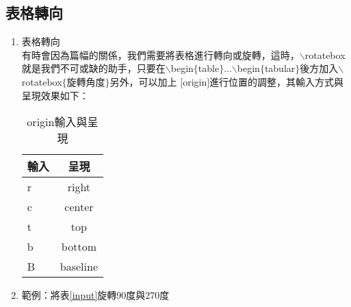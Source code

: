 \subsection{表格轉向}
\begin{enumerate}
\item 表格轉向\\
有時會因為篇幅的關係，我們需要將表格進行轉向或旋轉，這時，$\backslash$rotatebox就是我們不可或缺的助手，只要在$\backslash$begin$\{$table$\}$...$\backslash$begin$\{$tabular$\}$後方加入$\backslash$rotatebox$\{$旋轉角度$\}$另外，可以加上 $[$origin$]$進行位置的調整，其輸入方式與呈現效果如下：\\
\begin{table}[H]\caption{origin輸入與呈現}\label{origin} 
    \centering
    \extrarowheight=5pt   %
{\begin{tabular}{lc}
    \hline
    輸入  & 呈現
\\\hline  %
  r  & right
\\\hline
  c & center  \\\hline
  t & top     \\\hline
  b & bottom  \\\hline
  B & baseline \\\hline
    \end{tabular}}       
    \end{table}
\item 範例：將表\ref{input}旋轉90度與270度\\
\begin{table}[H]\caption{旋轉表格}\label{rotate} 
\centering
\end{table}
\end{enumerate}

